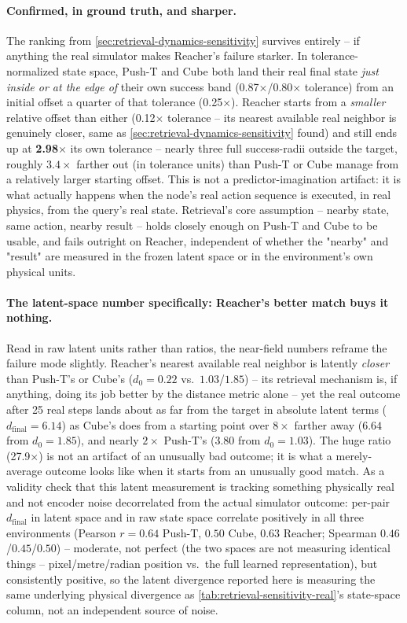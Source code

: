 \documentclass[11pt]{article}
\begin{document}
\paragraph{Confirmed, in ground truth, and sharper.} The ranking from
\cref{sec:retrieval-dynamics-sensitivity} survives entirely -- if anything the real simulator
makes Reacher's failure starker. In tolerance-normalized state space, Push-T and Cube both land
their real final state \emph{just inside or at the edge of} their own success band
(0.87$\times$/0.80$\times$ tolerance) from an initial offset a quarter of that tolerance
(0.25$\times$). Reacher starts from a \emph{smaller} relative offset than either (0.12$\times$
tolerance -- its nearest available real neighbor is genuinely closer, same as
\cref{sec:retrieval-dynamics-sensitivity} found) and still ends up at \textbf{2.98$\times$} its
own tolerance -- nearly three full success-radii outside the target, roughly $3.4\times$ farther
out (in tolerance units) than Push-T or Cube manage from a relatively larger starting offset.
This is not a predictor-imagination artifact: it is what actually happens when the node's real
action sequence is executed, in real physics, from the query's real state. Retrieval's core
assumption -- nearby state, same action, nearby result -- holds closely enough on Push-T and
Cube to be usable, and fails outright on Reacher, independent of whether the "nearby" and
"result" are measured in the frozen latent space or in the environment's own physical units.

\paragraph{The latent-space number specifically: Reacher's better match buys it nothing.}
Read in raw latent units rather than ratios, the near-field numbers reframe the failure mode
slightly. Reacher's nearest available real neighbor is latently \emph{closer} than Push-T's or
Cube's ($d_0=0.22$ vs.\ $1.03$/$1.85$) -- its retrieval mechanism is, if anything, doing its job
better by the distance metric alone -- yet the real outcome after 25 real steps lands about as
far from the target in absolute latent terms ($d_{\text{final}}=6.14$) as Cube's does from a
starting point over $8\times$ farther away ($6.64$ from $d_0=1.85$), and nearly $2\times$
Push-T's ($3.80$ from $d_0=1.03$). The huge ratio (27.9$\times$) is not an artifact of an
unusually bad outcome; it is what a merely-average outcome looks like when it starts from an
unusually good match. As a validity check that this latent measurement is tracking something
physically real and not encoder noise decorrelated from the actual simulator outcome: per-pair
$d_{\text{final}}$ in latent space and in raw state space correlate positively in all three
environments (Pearson $r=0.64$ Push-T, $0.50$ Cube, $0.63$ Reacher; Spearman $0.46$/$0.45$/$0.50$)
-- moderate, not perfect (the two spaces are not measuring identical things -- pixel/metre/radian
position vs.\ the full learned representation), but consistently positive, so the latent
divergence reported here is measuring the same underlying physical divergence as
\cref{tab:retrieval-sensitivity-real}'s state-space column, not an independent source of noise.
\end{document}
